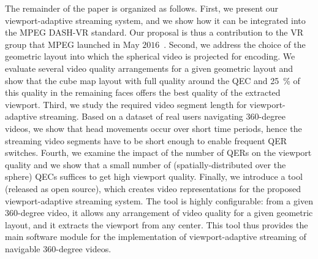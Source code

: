 The remainder of the paper is organized as follows. First, we
present our viewport-adaptive streaming
system, and
we show how it can be integrated into
the \ac{MPEG} \ac{DASH}-VR standard. Our proposal is thus a contribution
to the \ac{VR} group that \ac{MPEG} launched in May
$2016$~\cite{mpeg-vr}. Second, we address the choice of the geometric
layout into which the spherical video is projected for
encoding. We evaluate several video quality arrangements for a given
geometric layout and show that the cube map layout with full quality around the \ac{QEC} and \SI{25}{\percent} of this quality in the remaining faces offers the best quality of the extracted viewport.
Third, we study the required video segment length for
viewport-adaptive streaming. Based on a dataset of real users
navigating $360$-degree videos, we show that head movements occur over
short time periods, hence the streaming video segments have to be
short enough to enable frequent \ac{QER} switches. Fourth, we
examine the impact of the number of \acp{QER} on the viewport quality
and we show that a small number of (spatially-distributed over the sphere)
\acp{QEC} suffices to get high viewport quality.
Finally, we introduce a tool (released as open source), which creates video representations for the proposed viewport-adaptive streaming system.
The tool is highly configurable: from a given
$360$-degree video, it allows any arrangement of video quality for a
given geometric layout, and it extracts the viewport from any \FoV{} center.
This tool thus provides the main software module
for the implementation of viewport-adaptive streaming of navigable
$360$-degree videos.

